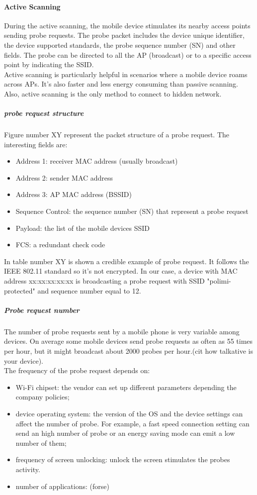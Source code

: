\paragraph{Active Scanning}
During the active scanning, the mobile device stimulates its nearby access points sending probe requests. The probe packet includes the device unique identifier, the device supported standards, the probe sequence number (SN) and other fields. The probe can be directed to all the AP (broadcast) or to a specific access point by indicating the SSID. \\
Active scanning is particularly helpful in scenarios where a mobile device roams across APs. It's also faster and less energy consuming than passive scanning.\\
Also, active scanning is the only method to connect to hidden network.
\subparagraph{probe request structure}
Figure number XY represent the packet structure of a probe request. The interesting fields are:
\begin{itemize}
\item Address 1: receiver MAC address (usually broadcast)
\item Address 2: sender MAC address
\item Address 3: AP MAC address (BSSID)
\item Sequence Control: the sequence number (SN) that represent a probe request
\item Payload: the list of the mobile devices SSID
\item FCS: a redundant check code 
\end{itemize}

In table number XY is shown a credible example of probe request. It follows the IEEE 802.11 standard so it's not encrypted. In our case, a device with MAC address xx:xx:xx:xx:xx is broadcasting a probe request with SSID "polimi-protected" and sequence number equal to 12.

\subparagraph{Probe request number}
The number of probe requests sent by a mobile phone is very variable among devices. On average some mobile devices send probe requests as often as 55 times per hour, but it might broadcast about 2000 probes per hour.(cit how talkative is your device).\\
The frequency of the probe request depends on:
\begin{itemize}
\item Wi-Fi chipset: the vendor can set up different parameters depending the company policies;
\item device operating system: the version of the OS and the device settings can affect the number of probe. For example, a fast speed connection setting can send an high number of probe or an energy saving mode can emit a low number of them;
\item frequency of screen unlocking: unlock the screen stimulates the probes activity.
\item number of applications: (forse)
\end{itemize}

